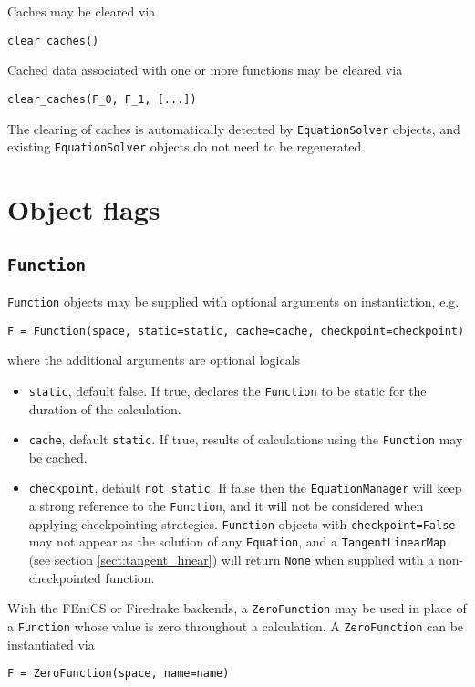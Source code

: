 \documentclass[11pt]{article}
\begin{document}
Caches may be cleared via
\begin{lstlisting}
clear_caches()
\end{lstlisting}
Cached data associated with one or more functions may be cleared via
\begin{lstlisting}
clear_caches(F_0, F_1, [...])
\end{lstlisting}

The clearing of caches is automatically detected by \texttt{EquationSolver}
objects, and existing \texttt{EquationSolver} objects do not need to be
regenerated.

\section{Object flags}\label{sect:flags}

\subsection{\texttt{Function}}\label{sect:Function_flags}

\texttt{Function} objects may be supplied with optional arguments on
instantiation, e.g.
\begin{lstlisting}
F = Function(space, static=static, cache=cache, checkpoint=checkpoint)
\end{lstlisting}
where the additional arguments are optional logicals
\begin{itemize}
  \item \texttt{static}, default false. If true, declares the \texttt{Function}
    to be static for the duration of the calculation.
  \item \texttt{cache}, default \texttt{static}. If true, results of
    calculations using the \texttt{Function} may be cached.
  \item \texttt{checkpoint}, default \texttt{not static}. If false then the
    \texttt{EquationManager} will keep a strong reference to the
    \texttt{Function}, and it will not be considered when applying
    checkpointing strategies. \texttt{Function} objects with
    \texttt{checkpoint=False} may not appear as the solution of any
    \texttt{Equation}, and a \texttt{TangentLinearMap} (see section
    \ref{sect:tangent_linear}) will return \texttt{None} when supplied with a
    non-checkpointed function.
\end{itemize}

With the FEniCS or Firedrake backends, a \texttt{ZeroFunction} may be used in
place of a \texttt{Function} whose value is zero throughout a calculation. A
\texttt{ZeroFunction} can be instantiated via
\begin{lstlisting}
F = ZeroFunction(space, name=name)
\end{lstlisting}
\end{document}
